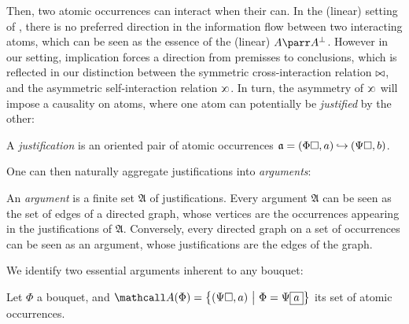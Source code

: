 \begin{scope}
Then, two atomic occurrences can interact when their  can. In the
(linear)  setting of \cite{lmcs:1089}, there is no preferred direction
in the information flow between two interacting atoms, which can be seen as the
essence of the (linear)  $A \parr A^\bot$. However in our
 setting, implication forces a direction from premisses to
conclusions, which is reflected in our distinction between the symmetric
cross-interaction relation $\mathbin{\bowtie}$, and the asymmetric self-interaction
relation $\sinter$. In turn, the asymmetry of
$\sinter$ will impose a causality on atoms, where one atom can potentially be
\emph{justified} by the other:

\begin{definition}[Justification]
  
  A \emph{justification} is an oriented pair of atomic occurrences $\mathfrak{a}
  = (\Phi\square, a) \mathbin{\hookrightarrow} (\Psi\square, b)$.
\end{definition}

One can then naturally aggregate justifications into \emph{arguments}:

\begin{definition}[Argument]
  
  An \emph{argument} is a finite set $\mathfrak{A}$ of justifications. Every
  argument $\mathfrak{A}$ can be seen as the set of edges of a directed graph,
  whose vertices are the occurrences appearing in the justifications of
  $\mathfrak{A}$. Conversely, every directed graph on a set of occurrences can
  be seen as an argument, whose justifications are the edges of the graph.
\end{definition}

We identify two essential arguments inherent to any bouquet:

\begin{definition} Let $\Phi$ a bouquet, and
  $\atomoccs{\Phi} = \compr{(\Psi\hole, a)}{\Phi = \Psi\select{a}}$ its set of
  atomic occurrences.
  

\end{definition}
\end{scope}
